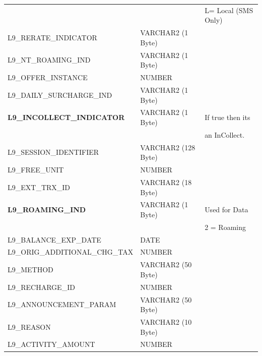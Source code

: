 \documentclass[12pt,twoside]{article}
\begin{document}
\begin{longtable}{lll}
                                         &                       &  L= Local (SMS Only)       \\
 L9\_RERATE\_INDICATOR                   &  VARCHAR2 (1 Byte)    &                            \\
 L9\_NT\_ROAMING\_IND                    &  VARCHAR2 (1 Byte)    &                            \\
 L9\_OFFER\_INSTANCE                     &  NUMBER               &                            \\
 L9\_DAILY\_SURCHARGE\_IND               &  VARCHAR2 (1 Byte)    &                            \\
 \textbf{L9\_INCOLLECT\_INDICATOR}       &  VARCHAR2 (1 Byte)    &  If true then its          \\
                                         &                       &  an InCollect.             \\
 L9\_SESSION\_IDENTIFIER                 &  VARCHAR2 (128 Byte)  &                            \\
 L9\_FREE\_UNIT                          &  NUMBER               &                            \\
 L9\_EXT\_TRX\_ID                        &  VARCHAR2 (18 Byte)   &                            \\
 \textbf{L9\_ROAMING\_IND}               &  VARCHAR2 (1 Byte)    &  Used for Data             \\
                                         &                       &  2 = Roaming               \\
 L9\_BALANCE\_EXP\_DATE                  &  DATE                 &                            \\
 L9\_ORIG\_ADDITIONAL\_CHG\_TAX          &  NUMBER               &                            \\
 L9\_METHOD                              &  VARCHAR2 (50 Byte)   &                            \\
 L9\_RECHARGE\_ID                        &  NUMBER               &                            \\
 L9\_ANNOUNCEMENT\_PARAM                 &  VARCHAR2 (50 Byte)   &                            \\
 L9\_REASON                              &  VARCHAR2 (10 Byte)   &                            \\
 L9\_ACTIVITY\_AMOUNT                    &  NUMBER               &                            \\

\end{longtable}
\end{document}
